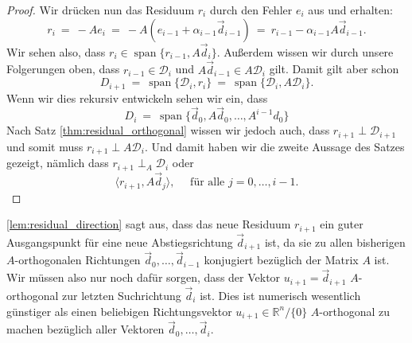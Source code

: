 \begin{proof}
Wir drücken nun das Residuum $r_i$ durch den Fehler $e_i$ aus und erhalten:
\begin{equation*}
r_i \ = \ -Ae_i \ = \ -A(e_{i-1} + \alpha_{i-1}\vec{d}_{i-1}) \ = \ r_{i-1} - \alpha_{i-1}A\vec{d}_{i-1}.
\end{equation*}
Wir sehen also, dass $r_i \in \operatorname{span}\lbrace r_{i-1}, A \vec{d}_i \rbrace$.
Außerdem wissen wir durch unsere Folgerungen oben, dass $r_{i-1} \in \mathcal{D}_i$ und $A \vec{d}_{i-1} \in A\mathcal{D}_i$ gilt.
Damit gilt aber schon
\begin{equation*}
D_{i+1} \ = \ \operatorname{span}\lbrace \mathcal{D}_i, r_i \rbrace \ = \ \operatorname{span}\lbrace \mathcal{D}_i, A \mathcal{D}_i \rbrace.
\end{equation*}
Wenn wir dies rekursiv entwickeln sehen wir ein, dass
\begin{equation*}
D_i \ = \ \operatorname{span}\lbrace \vec{d}_0, A\vec{d}_0, \ldots, A^{i-1}d_0\rbrace
\end{equation*}
Nach Satz \ref{thm:residual_orthogonal} wissen wir jedoch auch, dass $r_{i+1} \perp \mathcal{D}_{i+1}$ und somit muss $r_{i+1} \perp A\mathcal{D}_i$.
Und damit haben wir die zweite Aussage des Satzes gezeigt, nämlich dass $r_{i+1} \perp_A \mathcal{D}_i$ oder
\begin{equation*}
\langle r_{i+1}, A \vec{d}_j \rangle, \quad \text{ für alle } j=0,\ldots,i-1.
\end{equation*}
\end{proof}
\cref{lem:residual_direction} sagt aus, dass das neue Residuum $r_{i+1}$ ein guter Ausgangspunkt für eine neue Abstiegsrichtung $\vec{d}_{i+1}$ ist, da sie zu allen bisherigen $A$-orthogonalen Richtungen $\vec{d}_0,\ldots,\vec{d}_{i-1}$ konjugiert bezüglich der Matrix $A$ ist.
Wir müssen also nur noch dafür sorgen, dass der Vektor $u_{i+1} = \vec{d}_{i+1}$ $A$-orthogonal zur letzten Suchrichtung $\vec{d}_i$ ist.
Dies ist numerisch wesentlich günstiger als einen beliebigen Richtungsvektor $u_{i+1} \in \mathbb{R}^n / \lbrace 0 \rbrace$ $A$-orthogonal zu machen bezüglich aller Vektoren $\vec{d}_0,\ldots,\vec{d}_i$.

